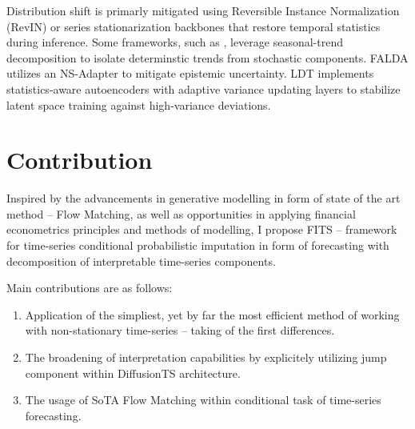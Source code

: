 Distribution shift is primarly mitigated using Reversible Instance Normalization (RevIN) \cite{kim2021revin, shen2023timediff} or series stationarization backbones \cite{liu2022nonstationary} that restore temporal statistics during inference. Some frameworks, such as \cite{wang2024falda, mrdiff, yuan2024diffusionts, cdpm}, leverage seasonal-trend decomposition to isolate determinstic trends from stochastic components. FALDA \cite{wang2024falda} utilizes an NS-Adapter to mitigate epistemic uncertainty. LDT \cite{feng2024ldt} implements statistics-aware autoencoders with adaptive variance updating layers to stabilize latent space training against high-variance deviations.

\section{Contribution}

Inspired by the advancements in generative modelling in form of state of the art method -- Flow Matching, as well as opportunities in applying financial econometrics principles and methods of modelling, I propose FITS -- framework for time-series conditional probabilistic imputation in form of forecasting with decomposition of interpretable time-series components.

Main contributions are as follows:

\begin{enumerate}
    \item Application of the simpliest, yet by far the most efficient method of working with non-stationary time-series -- taking of the first differences.
    \item The broadening of interpretation capabilities by explicitely utilizing jump component within DiffusionTS \cite{yuan2024diffusionts} architecture.
    \item The usage of SoTA Flow Matching within conditional task of time-series forecasting.
\end{enumerate}

